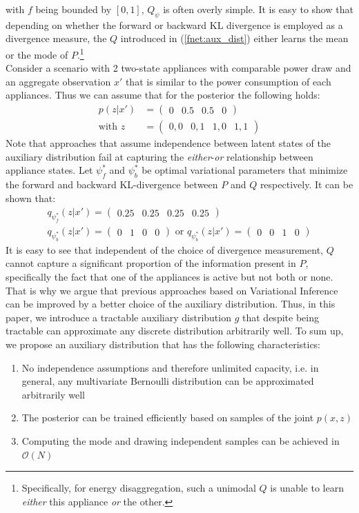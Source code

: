 with $f$ being bounded by $[0,1]$, $Q_\psi$ is often overly simple. It is easy to show that depending on whether the forward or backward KL divergence is employed as a divergence measure, the $Q$ introduced in (\ref{fnet:aux_dist}) either learns the mean or the mode of $P$.\footnote{Specifically, for energy disaggregation, such a unimodal $Q$ is unable to learn \emph{either} this appliance \emph{or} the other.}\\
Consider a scenario with 2 two-state appliances with comparable power draw and an aggregate observation $x'$ that is similar to the power consumption of each appliances. Thus we can assume that for the posterior the following holds:
\begin{align*}
p(z|x') &= \begin{pmatrix}
0&
0.5&
0.5&
0
\end{pmatrix}\\
 \text{with } z &=\begin{pmatrix} 0,0&
0,1 &
1,0 &
1,1 
\end{pmatrix}
\end{align*} Note that approaches that assume independence between latent states of the auxiliary distribution fail at capturing the \emph{either}-\emph{or} relationship between appliance states. Let $\psi^*_f$ and $\psi^*_b$ be optimal variational parameters that minimize the forward and backward KL-divergence between $P$ and $Q$ respectively. It can be shown that: 
\begin{align*}
q_{\psi^*_f}(z|x') = \begin{pmatrix}
0.25 &
0.25 &
0.25 &
0.25 
\end{pmatrix}\\
q_{\psi^*_b}(z|x') = \begin{pmatrix}
0 &
1 &
0 &
0 
\end{pmatrix}
\text{ or }
q_{\psi^*_b}(z|x') = \begin{pmatrix}
0 &
0 &
1 &
0 
\end{pmatrix}
\end{align*}
It is easy to see that independent of the choice of divergence measurement, $Q$ cannot capture a significant proportion of the information present in $P$, specifically the fact that one of the appliances is active but not both or none.\\
That is why we argue that previous approaches based on Variational Inference can be improved by a better choice of the auxiliary distribution. Thus, in this paper, we introduce a tractable auxiliary distribution $g$ that despite being tractable can approximate any discrete distribution arbitrarily well. To sum up, we propose an auxiliary distribution that has the following characteristics:
\begin{enumerate}
\item No independence assumptions and therefore unlimited capacity, i.e. in general, any multivariate Bernoulli distribution can be approximated arbitrarily well
\item The posterior can be trained efficiently based on samples of the joint $p(x,z)$
\item Computing the mode and drawing independent samples can be achieved in $\mathcal{O}(N)$
\end{enumerate}

